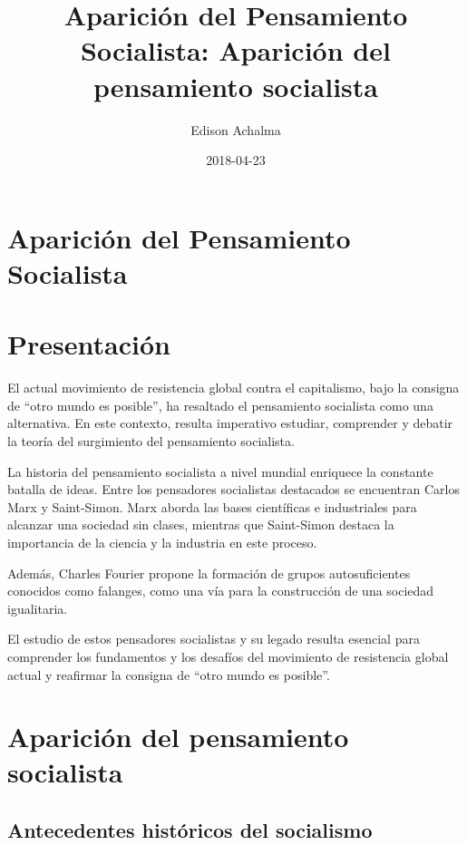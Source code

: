 \documentclass[
  jou,
  floatsintext,
  longtable,
  a4paper,
  nolmodern,
  notxfonts,
  notimes,
  colorlinks=true,linkcolor=blue,citecolor=blue,urlcolor=blue]{apa7}
\title{Aparición del Pensamiento Socialista: Aparición del pensamiento
socialista}
\author{Edison Achalma}
\affiliation{
{Escuela Profesional de Economía, Universidad Nacional de San Cristóbal
de Huamanga}}
\date{2018-04-23}
\begin{document}
\maketitle

\hypertarget{toc}{}
\tableofcontents
\newpage
\section[Introduction]{Aparición del Pensamiento Socialista}

\setcounter{secnumdepth}{-\maxdimen} %

\setlength\LTleft{0pt}


\section{Presentación}\label{presentaciuxf3n}

El actual movimiento de resistencia global contra el capitalismo, bajo
la consigna de ``otro mundo es posible'', ha resaltado el pensamiento
socialista como una alternativa. En este contexto, resulta imperativo
estudiar, comprender y debatir la teoría del surgimiento del pensamiento
socialista.

La historia del pensamiento socialista a nivel mundial enriquece la
constante batalla de ideas. Entre los pensadores socialistas destacados
se encuentran Carlos Marx y Saint-Simon. Marx aborda las bases
científicas e industriales para alcanzar una sociedad sin clases,
mientras que Saint-Simon destaca la importancia de la ciencia y la
industria en este proceso.

Además, Charles Fourier propone la formación de grupos autosuficientes
conocidos como falanges, como una vía para la construcción de una
sociedad igualitaria.

El estudio de estos pensadores socialistas y su legado resulta esencial
para comprender los fundamentos y los desafíos del movimiento de
resistencia global actual y reafirmar la consigna de ``otro mundo es
posible''.

\section{Aparición del pensamiento
socialista}\label{apariciuxf3n-del-pensamiento-socialista}

\subsection{Antecedentes históricos del
socialismo}\label{antecedentes-histuxf3ricos-del-socialismo}
\end{document}
